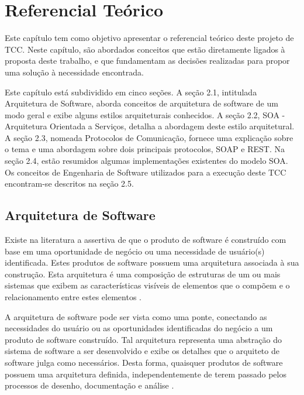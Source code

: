 \chapter[Referencial Teórico]{Referencial Teórico}

Este capítulo tem como objetivo apresentar o referencial teórico deste projeto de TCC. Neste capítulo, são abordados conceitos que estão diretamente ligados à proposta deste trabalho, e que fundamentam as decisões realizadas para propor uma solução à necessidade encontrada.

Este capítulo está subdividido em cinco seções. A seção 2.1, intitulada Arquitetura de Software, aborda conceitos de arquitetura de software de um modo geral e exibe alguns estilos arquiteturais conhecidos. A seção 2.2, SOA - Arquitetura Orientada a Serviços, detalha a abordagem deste estilo arquitetural. A seção 2.3, nomeada Protocolos de Comunicação, fornece uma explicação sobre o tema e uma abordagem sobre dois principais protocolos, SOAP e REST. Na seção 2.4, estão resumidos algumas implementações existentes do modelo SOA. Os conceitos de Engenharia de Software utilizados para a execução deste TCC encontram-se descritos na seção 2.5.

\section{Arquitetura de Software}
Existe na literatura a assertiva de que o produto de software é construído com base em uma oportunidade de negócio ou uma necessidade de usuário(s) identificada. Estes produtos de software possuem uma arquitetura associada à sua construção. Esta arquitetura é uma composição de estruturas de um ou mais sistemas que exibem as características visíveis de elementos que o compõem e o relacionamento entre estes elementos \cite{bass_software_archi_practice_2003}.

A arquitetura de software pode ser vista como uma ponte, conectando as necessidades do usuário ou as oportunidades identificadas do negócio a um produto de software construído. Tal arquitetura representa uma abstração do sistema de software a ser desenvolvido e exibe os detalhes que o arquiteto de software julga como necessários. Desta forma, quaisquer produtos de software possuem uma arquitetura definida, independentemente de terem passado pelos processos de desenho, documentação e análise \cite{bass_software_archi_practice_2003}.


